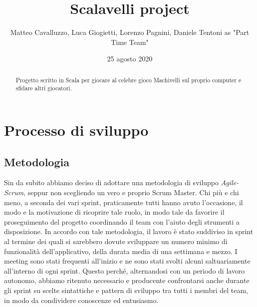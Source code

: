 \documentclass{article}
\title{Scalavelli project}
\date{25 agosto 2020}
\author{Matteo Cavalluzzo, Luca Giogietti, Lorenzo Pagnini, Daniele Tentoni as "Part Time Team"}
\begin{document}
    \maketitle
    \newpage

    \begin{abstract}
        Progetto scritto in Scala per giocare al celebre gioco Machivelli sul proprio computer e sfidare altri giocatori.
    \end{abstract}

    \tableofcontents

    \newpage


    \section{Processo di sviluppo}

    \subsection{Metodologia}

    Sin da subito abbiamo deciso di adottare una metodologia di sviluppo \textit{Agile-Scrum}, seppur non scegliendo un
    vero e proprio Scrum Master. Chi più e chi meno, a seconda dei vari sprint, praticamente tutti hanno avuto
    l'occasione, il modo e la motivazione di ricoprire tale ruolo, in modo tale da favorire il proseguimento del
    progetto coordinando il team con l'aiuto degli strumenti a disposizione. %
    In accordo con tale metodologia, il lavoro è stato suddiviso in sprint al termine dei quali si sarebbero dovute
    sviluppare un numero minimo di funzionalità dell'applicativo, della durata media di una settimana e mezzo. I meeting
    sono stati frequenti all'inizio e ne sono stati svolti alcuni saltuariamente all'interno di ogni sprint. Questo
    perché, alternandosi con un periodo di lavoro autonomo, abbiamo ritenuto necessario e producente confrontarsi anche
    durante gli sprint su scelte sintattiche e pattern di sviluppo tra tutti i membri del team, in modo da condividere
    conoscenze ed entusiasmo.
\end{document}
